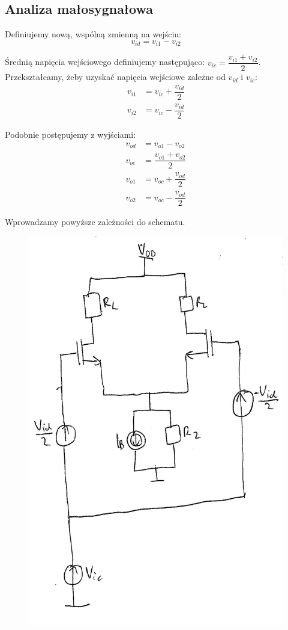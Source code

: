 \documentclass[10pt,a4paper]{article}
\begin{document}
\subsection{Analiza małosygnałowa}

Definiujemy nową, wspólną zmienną na wejściu:
\begin{equation}
v_{id}=v_{i1}-v_{i2}
\end{equation}

Średnią napięcia wejściowego definiujemy następująco: $v_{ic}=\dfrac{v_{i1}+v_{i2}}{2}$. Przekształcamy, żeby uzyskać napięcia wejściowe zależne od $v_{id}$ i $v_{ic}$:
\begin{align*}
v_{i1}&=v_{ic}+\dfrac{v_{id}}{2} \\
v_{i2}&=v_{ic}-\dfrac{v_{id}}{2}
\end{align*}

Podobnie postępujemy z wyjściami:
\begin{align*}
v_{od}&=v_{o1}-v_{o2} \\
v_{oc}&=\dfrac{v_{o1}+v_{o2}}{2} \\
v_{o1}&=v_{oc}+\dfrac{v_{od}}{2} \\
v_{o2}&=v_{oc}-\dfrac{v_{od}}{2}
\end{align*}

Wprowadzamy powyższe zależności do schematu.
\begin{figure}[H]
\centering
\includegraphics[scale=1]{roznicowy_nowe_oznaczenia}
\end{figure}
\end{document}
